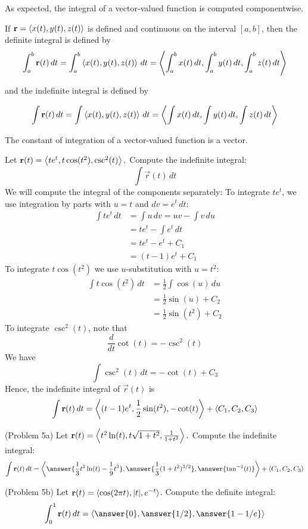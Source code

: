 \documentclass[handout]{ximera}
\begin{document}
As expected, the integral of a vector-valued function is computed componentwise.

\begin{definition}
If $\mathbf r = \left\langle x(t), y(t), z(t)\right\rangle$ is defined and continuous on the interval $[a, b]$, then the definite integral is defined by
\[
\int_a^b \mathbf r(t) \, dt = \int_a^b \left\langle x(t), y(t), z(t)\right\rangle \, dt =  \left\langle \int_a^b x(t) \, dt,\int_a^b  y(t) \, dt,\int_a^b  z(t) \, dt\right\rangle
\]

and the indefinite integral is defined by

\[
\int \mathbf r(t) \, dt = \int\left\langle x(t), y(t), z(t)\right\rangle \, dt =  \left\langle \int x(t) \, dt,\int  y(t) \, dt,\int  z(t) \, dt\right\rangle
\]
\end{definition}

\begin{remark}
The constant of integration of a vector-valued function is a vector.
\end{remark}

\begin{example}[Example 5]
Let $\mathbf r(t) = \left\langle te^t,t\cos(t^2),\csc^2(t)\right\rangle.$ Compute the indefinite integral:
\[
\int \vec r(t) \, dt
\]
We will compute the integral of the components separately:
To integrate $te^t$, we use integration by parts with $u = t$ and $dv = e^t \, dt$:
\begin{align*}
\int te^t \, dt &= \int u \, dv = uv - \int v \, du\\
                 &= te^t - \int e^t \, dt\\
                 & = te^t - e^t + C_1\\
                 & = (t-1)e^t + C_1
\end{align*}
To integrate $t\cos(t^2)$ we use $u$-substitution with $ u = t^2$:
\begin{align*}
\int t\cos(t^2) \, dt &= \frac12 \int \cos(u) \, du \\
                 &= \frac12 \sin(u) + C_2\\
                 & = \frac12 \sin(t^2) + C_2
\end{align*}
To integrate $\csc^2(t)$, note that
\[
\frac{d}{dt} \cot(t) = -\csc^2(t)
\]
We have
\[
\int \csc^2(t) \, dt = -\cot(t) + C_3
\]
Hence, the indefinite integral of $\vec r(t)$ is
\[
\int \mathbf r(t) \, dt = \left\langle (t-1)e^t,\frac12 \sin(t^2),-\cot(t)\right\rangle + \left\langle C_1, C_2, C_3\right\rangle
\]

\end{example}

\begin{problem}(Problem 5a)
Let $\mathbf r(t) = \left\langle t^2\ln(t),t\sqrt{1+t^2},\frac{1}{1+t^2}\right\rangle.$ Compute the indefinite integral:
\[
\int \vec r(t) \, dt = \vector{\answer{\frac13 t^3 \ln(t) - \frac19 t^3},\answer{\frac13 (1+t^2)^{3/2}},\answer{\tan^{-1}(t)}} + \vector{C_1, C_2, C_3}
\]

\end{problem}

\begin{problem}(Problem 5b)
Let $\mathbf r(t) = \left\langle \cos(2\pi t),|t|,e^{-t}\right\rangle$. Compute the definite integral:
\[
\int_0^1 \vec r(t) \, dt = \vector{\answer{0}, \answer{1/2}, \answer{1 - 1/e}}
\]
\end{problem}
\end{document}
